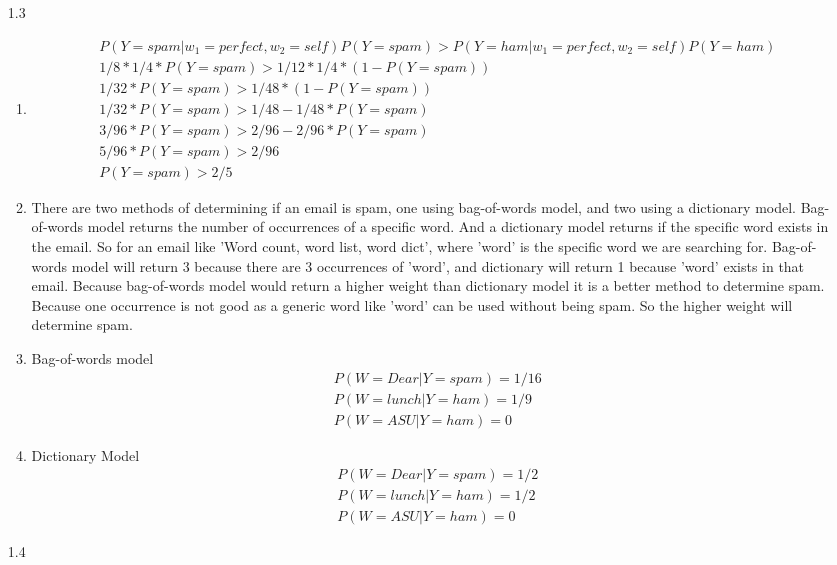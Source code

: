 \documentclass[letterpaper, 12pt]{article}
\begin{document}
\begin{enumerate}
\begin{enumerate}
        \end{enumerate}
    \item[1.3]
        \begin{enumerate}
            \item
                  \begin{gather*}
                      P(Y=spam | w_1 = perfect, w_2 = self) P(Y = spam)> P(Y = ham | w_1 = perfect, w_2 = self) P(Y=ham)\\
                      1/8 * 1/4 * P(Y=spam) > 1/12 * 1/4 * (1- P(Y=spam)) \\
                      1/32 * P(Y=spam) > 1/48 * (1-P(Y=spam)) \\
                      1/32 * P(Y=spam) > 1/48  - 1/48 * P(Y=spam) \\
                      3/96 * P(Y=spam) > 2/96  - 2/96 * P(Y=spam) \\
                      5/96 * P(Y=spam) > 2/96 \\
                      P(Y=spam) > 2 / 5
                  \end{gather*}
            \item
                  There are two methods of determining if an email is spam, one using bag-of-words model, and two using a
                  dictionary model. Bag-of-words model returns the number of occurrences of a specific word. And a dictionary
                  model returns if the specific word exists in the email. So for an email like 'Word count, word list, word dict',
                  where 'word' is the specific word we are searching for. Bag-of-words model will return 3 because there are 3 occurrences
                  of 'word', and dictionary will return 1 because 'word' exists in that email. Because bag-of-words model would return
                  a higher weight than dictionary model it is a better method to determine spam. Because one occurrence is not good as a
                  generic word like 'word' can be used without being spam. So the higher weight will determine spam.
            \item Bag-of-words model
                  \begin{gather*}
                      P(W=Dear | Y = spam) = 1/16 \\
                      P(W=lunch | Y = ham) = 1/9 \\
                      P(W=ASU | Y = ham) = 0
                  \end{gather*}
            \item Dictionary Model
                  \begin{gather*}
                      P(W=Dear | Y = spam) = 1/2 \\
                      P(W=lunch | Y = ham) = 1/2 \\
                      P(W=ASU | Y = ham) = 0
                  \end{gather*}
        \end{enumerate}
    \item[1.4]


\end{enumerate}
\end{document}

